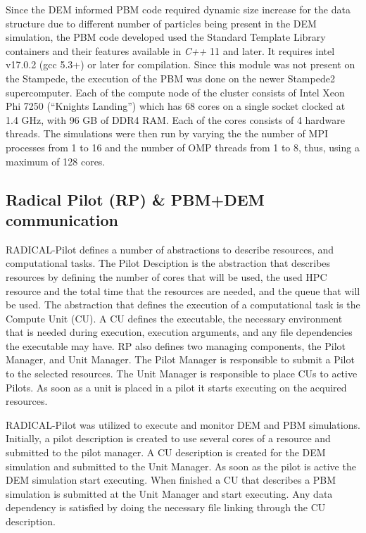 \documentclass[preprint,11pt,authoryear]{elsarticle}
\begin{document}
Since the DEM informed PBM code required dynamic size increase for the data structure due to different number of particles being
 present in the DEM simulation,
the PBM code developed used the Standard Template Library containers and their features available in \textit{C++} 11 and later. It 
requires intel v17.0.2 (gcc 5.3+)  or later for compilation. Since this module was not present on the Stampede, the execution of the 
PBM was done on the newer Stampede2 supercomputer. Each of the compute node of the cluster consists of Intel Xeon Phi 7250 
(\textquotedblleft Knights Landing\textquotedblright) which has 68 cores on a single socket clocked at 1.4 GHz, with 96 GB of DDR4 
RAM.
 Each of the cores consists of 4 hardware threads. The simulations were then run by varying the the number of MPI 
processes from 1 to 16 and the number of OMP threads from 1 to 8, thus, using a maximum of 128 cores.

\subsection{Radical Pilot (RP) \& PBM+DEM communication}
RADICAL-Pilot defines a number of abstractions to describe resources, and computational 
tasks. The Pilot Desciption is the abstraction that describes resources by defining the 
number of cores that will be used, the used HPC resource and the total time that the 
resources are needed, and the queue that will be used. The abstraction that defines the 
execution of a computational task is the Compute Unit (CU). A CU defines the executable, 
the necessary environment that is needed during execution, execution arguments, and any 
file dependencies the executable may have. RP also defines two managing components, the
Pilot Manager, and Unit Manager. The Pilot Manager is responsible to submit a Pilot to the
selected resources. The Unit Manager is responsible to place CUs to active Pilots. As soon as
a unit is placed in a pilot it starts executing on the acquired resources.

RADICAL-Pilot was utilized to execute and monitor DEM and PBM simulations. Initially, a pilot
description is created to use several cores of a resource and submitted to the pilot manager. A
CU description is created for the DEM simulation and submitted to the Unit Manager. As soon as the
pilot is active the DEM simulation start executing. When finished a CU that describes a PBM 
simulation is submitted at the Unit Manager and start executing. Any data dependency is satisfied 
by doing the necessary file linking through the CU description.
\end{document}
